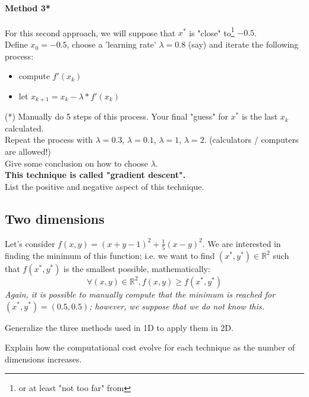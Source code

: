 \documentclass[]{article}
\newcommand{\R}{\mathbb{R}}
\begin{document}
	\paragraph{Method 3*}
	For this second approach, we will suppose that $x^*$ is "close" to\footnote{or at least "not too far" from} $-0.5$.\\
	Define $x_0=-0.5$, choose a 'learning rate' $\lambda=0.8$ (say) and iterate the following process:
	\begin{itemize}
		\item compute $f'(x_k)$
		\item let $x_{k+1} = x_k - \lambda * f'(x_k)$
	\end{itemize}
	(*) Manually do 5 steps of this process.
	Your final "guess" for $x^*$ is the last $x_k$ calculated.\\
	Repeat the process with $\lambda=0.3$, $\lambda=0.1$, $\lambda=1$, $\lambda=2$. (calculators / computers are allowed!)\\
	Give some conclusion on how to choose $\lambda$.\\
	\textbf{This technique is called "gradient descent".}\\
	List the positive and negative aspect of this technique.
	
	\subsection{Two dimensions}
	Let's consider $f(x,y) = (x+y-1)^2 + \frac{1}{5}(x-y)^2$.
	We are interested in finding the minimum of this function; 
	i.e. we want to find $(x^*,y^*) \in \R^2$ such that $f(x^*,y^*)$ is the smallest possible, mathematically:
	$$\forall (x,y) \in \R^2, f(x,y) \geq f(x^*, y^*)$$
	\textit{Again, it is possible to manually compute that the minimum is reached for $(x^*, y^*) = (0.5, 0.5)$; however, we suppose that we do not know this.}
	
	Generalize the three methods used in 1D to apply them in 2D.
		
	Explain how the computational cost evolve for each technique as the number of dimensions increases.
	
	
	
	
	
	
	
\end{document}
